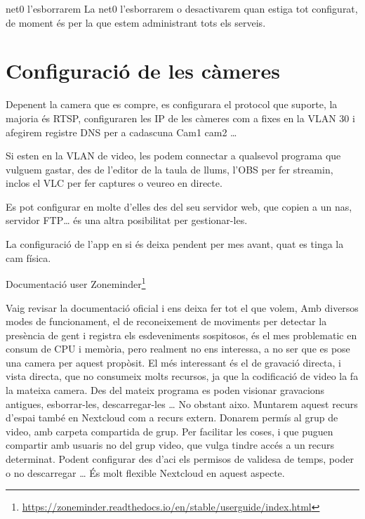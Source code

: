 \documentclass[
  10pt,
]{krantz}
\DeclareRobustCommand{\href}[2]{#2\footnote{\url{#1}}}
\begin{document}
\begin{rmdcuidao}{net0 l'esborrarem}
La net0 l'esborrarem o desactivarem quan estiga tot configurat, de moment és per la que estem administrant tots els serveis.

\end{rmdcuidao}

\hypertarget{configuraciuxf3-de-les-cuxe0meres}{%
\section{Configuració de les càmeres}\label{configuraciuxf3-de-les-cuxe0meres}}

Depenent la camera que es compre, es configurara el protocol que suporte, la majoria és RTSP, configuraren les IP de les càmeres com a fixes en la VLAN 30 i afegirem registre DNS per a cadascuna Cam1 cam2 \ldots{}

Si esten en la VLAN de video, les podem connectar a qualsevol programa que vulguem gastar, des de l'editor de la taula de llums, l'OBS per fer streamin, inclos el VLC per fer captures o veureo en directe.

Es pot configurar en molte d'elles des del seu servidor web, que copien a un nas, servidor FTP\ldots{} és una altra posibilitat per gestionar-les.

La configuració de l'app en si és deixa pendent per mes avant, quat es tinga la cam física.

\href{https://zoneminder.readthedocs.io/en/stable/userguide/index.html}{Documentació user Zoneminder}

Vaig revisar la documentació oficial i ens deixa fer tot el que volem, Amb diversos modes de funcionament, el de reconeixement de moviments per detectar la presència de gent i registra els esdeveniments sospitosos, és el mes problematic en consum de CPU i memòria, pero realment no ens interessa, a no ser que es pose una camera per aquest propòsit. El més interessant és el de gravació directa, i vista directa, que no consumeix molts recursos, ja que la codificació de video la fa la mateixa camera. Des del mateix programa es poden visionar gravacions antigues, esborrar-les, descarregar-les \ldots{} No obstant aixo. Muntarem aquest recurs d'espai també en Nextcloud com a recurs extern. Donarem permís al grup de video, amb carpeta compartida de grup. Per facilitar les coses, i que puguen compartir amb usuaris no del grup video, que vulga tindre accés a un recurs determinat. Podent configurar des d'aci els permisos de validesa de temps, poder o no descarregar \ldots{} És molt flexible Nextcloud en aquest aspecte.
\end{document}
